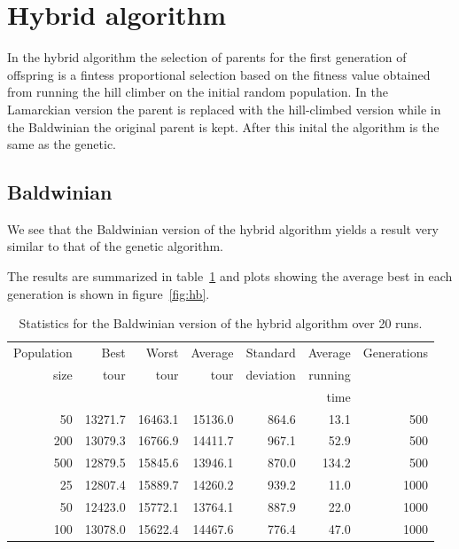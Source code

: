 \documentclass[a4paper]{article}
\begin{document}
\newpage

\section*{Hybrid algorithm}

In the hybrid algorithm the selection of parents for the first generation
of offspring is a fintess proportional selection based on the fitness value
obtained from running the hill climber on the initial random population.
In the Lamarckian version the parent is replaced with the hill-climbed version
while in the Baldwinian the original parent is kept. After this inital the
algorithm is the same as the genetic.

\subsection*{Baldwinian}

We see that the Baldwinian version of the hybrid algorithm yields a result
very similar to that of the genetic algorithm.

The results are summarized in table~\ref{tab:hb} and plots showing the average
best in each generation is shown in figure~\ref{fig:hb}.

\begin{table}[h]
  \centering
  \begin{tabular}{rrrrrrr}
    Population & Best & Worst & Average &
    Standard & Average & Generations \\
    size & tour & tour & tour & deviation & running & \\
    & & & & & time & \\
    \hline
    50 & 13271.7 & 16463.1 & 15136.0 & 864.6 & 13.1 & 500 \\
    200 & 13079.3 & 16766.9 & 14411.7 & 967.1 & 52.9 & 500 \\
    500 & 12879.5 & 15845.6 & 13946.1 & 870.0 & 134.2 & 500 \\
    25 & 12807.4 & 15889.7 & 14260.2 & 939.2 & 11.0 & 1000 \\
    50 & 12423.0 & 15772.1 & 13764.1 & 887.9 & 22.0 & 1000 \\
    100 & 13078.0 & 15622.4 & 14467.6 & 776.4 & 47.0 & 1000 \\
  \end{tabular}
  \caption{Statistics for the Baldwinian version of the hybrid algorithm
    over 20 runs.}
  \label{tab:hb}
\end{table}
\end{document}
